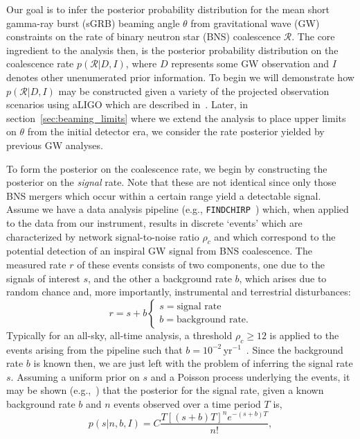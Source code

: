\documentclass[twocolumn,nofootinbib]{revtex4-1}
\newcommand{\cbcrate}{{{\mathcal R}}}
\def\bns#1{binary neutron star#1 (BNS#1)\gdef\bns{BNS}}
\def\gw#1{gravitational wave#1 (GW#1)\gdef\gw{GW}}
\def\sgrb#1{short gamma-ray burst#1 (sGRB#1)\gdef\sgrb{sGRB}}
\begin{document}
Our goal is to infer the posterior probability distribution for the mean \sgrb{}
beaming angle $\theta$ from \gw{} constraints on the rate of \bns{} coalescence
$\cbcrate$.  The core ingredient to the analysis then, is the posterior
probability distribution on the coalescence rate $p(\cbcrate|D,I)$, where $D$
represents some \gw{} observation and $I$ denotes other unenumerated prior
information.   To begin we will demonstrate how $p(\cbcrate|D,I)$ may be
constructed given a variety of the projected observation scenarios using aLIGO
which are described in~\cite{ade_prospects}.  Later, in
section~\ref{sec:beaming_limits} where we extend the analysis to place upper
limits on $\theta$ from the initial detector era, we consider the rate posterior
yielded by previous \gw{} analyses.

To form the posterior on the coalescence rate, we begin by constructing the
posterior on the \emph{signal} rate.  Note that these are not identical since
only those \bns{} mergers which occur within a certain range yield a detectable
signal.  Assume we have a data analysis pipeline (e.g.,
{\tt FINDCHIRP}~\cite{2012PhRvD..85l2006A}) which, when applied to the data from
our instrument, results in discrete `events' which are characterized by network
signal-to-noise ratio $\rho_c$ and which correspond to the potential
detection of an inspiral \gw{} signal from \bns{} coalescence.  The measured
rate $r$ of these events consists of two components, one due to the signals of
interest $s$, and the other a background rate $b$, which arises due to random
chance and, more importantly, instrumental and terrestrial disturbances:
%
\begin{equation}
r = s + b
\begin{cases}
s = \text{signal rate} \\
b = \text{background rate}.
\end{cases}
\end{equation}
%
Typically for an all-sky, all-time analysis, a threshold $\rho_c\geq 12$ is
applied to the events arising from the pipeline such that
$b=10^{-2}$\,yr$^{-1}$~\cite{ade_prospects}.  Since the background rate $b$ is
known then, we are just left with the problem of inferring the signal rate $s$.
Assuming a uniform prior on $s$ and a Poisson process underlying the events, it
may be shown (e.g.,~\cite{2010blda.book.....G}) that the posterior for the
signal rate, given a known background rate $b$ and $n$ events observed over a
time period $T$ is,
%
\begin{equation}
p(s|n,b,I) = C \frac{ T\left[(s+b)T\right]^n e^{-(s+b)T}}{n!},
\end{equation}
\end{document}
